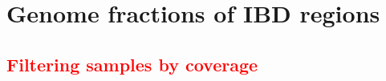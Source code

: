 \documentclass{article}
\begin{document}
\newpage


\section{Genome fractions of IBD regions}

\subsection{\textcolor{red}{Filtering samples by coverage}}

\begin{figure}[h]
\centering
{}
\caption{}
\end{figure}
\end{document}
